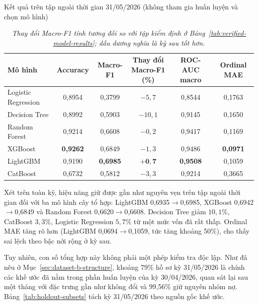 \begin{table}[H]
\centering
\caption{Kết quả trên tập ngoài thời gian 31/05/2026 (không tham gia huấn luyện và chọn mô hình)}
\label{tab:holdout-b-results}
\begin{tabular}{|l|c|c|c|c|c|}
\hline
Mô hình & Accuracy & Macro-F1 & \makecell{Thay đổi\\Macro-F1 (\%)} & ROC-AUC macro & Ordinal MAE\\
\hline
Logistic Regression & 0,8954 & 0,3799 & $-5,7$ & 0,8544 & 0,1763\\
Decision Tree & 0,8992 & 0,5903 & $-10,1$ & 0,9145 & 0,1650\\
Random Forest & 0,9214 & 0,6608 & $-0,2$ & 0,9417 & 0,1169\\
XGBoost & \textbf{0,9262} & 0,6849 & $-1,3$ & 0,9486 & \textbf{0,0971}\\
LightGBM & 0,9190 & \textbf{0,6985} & $\mathbf{+0,7}$ & \textbf{0,9508} & 0,1059\\
CatBoost & 0,6732 & 0,5812 & $-3,3$ & 0,9214 & 0,3665\\
\hline
\end{tabular}
\caption*{\textit{Thay đổi Macro-F1 tính tương đối so với tập kiểm định ở Bảng~\ref{tab:verified-model-results}; dấu dương nghĩa là kỳ sau tốt hơn.}}
\end{table}

Xét trên toàn kỳ, hiệu năng giữ được gần như nguyên vẹn trên tập ngoài thời gian đối với ba mô hình cây tổ hợp: LightGBM 0,6935$\to$0,6985, XGBoost 0,6942$\to$0,6849 và Random Forest 0,6620$\to$0,6608. Decision Tree giảm $10,1\%$, CatBoost $3,3\%$, Logistic Regression $5,7\%$ từ một mức vốn đã rất thấp. Ordinal MAE tăng rõ hơn (LightGBM 0,0694$\to$0,1059, tức tăng khoảng 50\%), cho thấy sai lệch theo bậc nới rộng ở kỳ sau.

Tuy nhiên, con số tổng hợp này không phải một phép kiểm tra độc lập. Như đã nêu ở Mục~\ref{sec:dataset-b-structure}, khoảng 79\% hồ sơ kỳ 31/05/2026 là chính các khế ước đã nằm trong phần huấn luyện của kỳ 30/04/2026, quan sát lại sau một tháng với đặc trưng gần như không đổi và 99,56\% giữ nguyên nhóm nợ. Bảng~\ref{tab:holdout-subsets} tách kỳ 31/05/2026 theo nguồn gốc khế ước.

